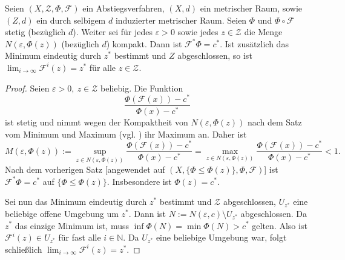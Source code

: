 \begin{korollar}
	\label{satz-abstiegsverfahren-konv}
	Seien $(X, \mathcal{Z}, \Phi, \mathcal{F})$ ein Abstiegsverfahren, $(X,d)$ ein metrischer Raum, sowie $(Z,d)$ ein durch selbigem $d$ induzierter metrischer Raum. Seien $\Phi$ und $\Phi \circ \mathcal{F}$ stetig (bezüglich $d$). Weiter sei für jedes $\varepsilon > 0$ sowie jedes $z \in \mathcal{Z}$ die Menge $N(\varepsilon, \Phi(z))$ (bezüglich $d$) kompakt. Dann ist $\mathcal{F}^* \Phi = c^*$. Ist zusätzlich das Minimum eindeutig durch $z^*$ bestimmt und $Z$ abgeschlossen, so ist $\lim_{i \rightarrow \infty} \mathcal{F}^i(z) = z^*$ für alle $z \in \mathcal{Z}$.
\end{korollar}
\begin{proof}
	Seien $\varepsilon > 0,\ z \in \mathcal{Z}$ beliebig. Die Funktion 
	$$	
	\frac{\Phi(\mathcal{F}(x)) - c^*}{\Phi(x) - c^*}
	$$ ist stetig und nimmt wegen der Kompaktheit von $N(\varepsilon, \Phi(z))$ nach dem Satz vom Minimum und Maximum (vgl. \cite{ae-ana1}) ihr Maximum an. Daher ist
	$$
	M(\varepsilon, \Phi(z)) := 
	\sup_{z \in N(\varepsilon, \Phi(z))} \frac{\Phi(\mathcal{F}(x)) - c^*}{\Phi(x) - c^*} = 
	\max_{z \in N(\varepsilon, \Phi(z))} \frac{\Phi(\mathcal{F}(x)) - c^*}{\Phi(x) - c^*}
	< 1.
	$$
	Nach dem vorherigen Satz [angewendet auf 
	$(X, \{ \Phi \leq \Phi(z) \}, \Phi, \mathcal{F})$] 
	ist $\mathcal{F}^* \Phi = c^*$ auf $\{ \Phi \leq \Phi(z) \}$. Insbesondere ist $\Phi(z) = c^*$. 
	
	Sei nun das Minimum eindeutig durch $z^*$ bestimmt und $\mathcal{Z}$ abgeschlossen, $U_{z^*}$ eine beliebige offene Umgebung um $z^*$. Dann ist $N := N(\varepsilon, c) \setminus U_{z^*}$ abgeschlossen. Da $z^*$ das einzige Minimum ist, muss $\inf \Phi(N) = \min \Phi(N) > c^*$ gelten. Also ist $\mathcal{F}^i(z) \in U_{z^*}$ für fast alle $i \in \mathbb{N}$. Da $U_{z^*}$ eine beliebige Umgebung war, folgt schließlich $\lim_{i \rightarrow \infty} \mathcal{F}^i(z) = z^*$.
\end{proof}
